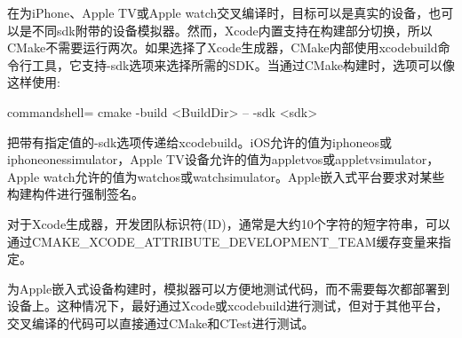 在为iPhone、Apple TV或Apple watch交叉编译时，目标可以是真实的设备，也可以是不同sdk附带的设备模拟器。然而，Xcode内置支持在构建部分切换，所以CMake不需要运行两次。如果选择了Xcode生成器，CMake内部使用xcodebuild命令行工具，它支持-sdk选项来选择所需的SDK。当通过CMake构建时，选项可以像这样使用:

\begin{tcblisting}{commandshell={}}
cmake -build <BuildDir> -- -sdk <sdk>
\end{tcblisting}

把带有指定值的-sdk选项传递给xcodebuild。iOS允许的值为iphoneos或iphoneonessimulator，Apple TV设备允许的值为appletvos或appletvsimulator，Apple watch允许的值为watchos或watchsimulator。Apple嵌入式平台要求对某些构建构件进行强制签名。

对于Xcode生成器，开发团队标识符(ID)，通常是大约10个字符的短字符串，可以通过CMAKE\_XCODE\_ATTRIBUTE\_DEVELOPMENT\_TEAM缓存变量来指定。

为Apple嵌入式设备构建时，模拟器可以方便地测试代码，而不需要每次都部署到设备上。这种情况下，最好通过Xcode或xcodebuild进行测试，但对于其他平台，交叉编译的代码可以直接通过CMake和CTest进行测试。



























